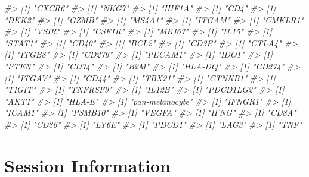 \documentclass[]{article}
\newcommand{\hlcom}[1]{\textcolor[rgb]{0.502,0.502,0.502}{\textit{#1}}}%
\newenvironment{Shaded}{\begin{myshaded}}{\end{myshaded}}
\newcommand{\CommentTok}[1]{\hlcom{#1}}
\begin{document}
\begin{Shaded}
\begin{Highlighting}[]
\CommentTok{\#\textgreater{} [1] "CXCR6"}
\CommentTok{\#\textgreater{} [1] "NKG7"}
\CommentTok{\#\textgreater{} [1] "HIF1A"}
\CommentTok{\#\textgreater{} [1] "CD4"}
\CommentTok{\#\textgreater{} [1] "DKK2"}
\CommentTok{\#\textgreater{} [1] "GZMB"}
\CommentTok{\#\textgreater{} [1] "MS4A1"}
\CommentTok{\#\textgreater{} [1] "ITGAM"}
\CommentTok{\#\textgreater{} [1] "CMKLR1"}
\CommentTok{\#\textgreater{} [1] "VSIR"}
\CommentTok{\#\textgreater{} [1] "CSF1R"}
\CommentTok{\#\textgreater{} [1] "MKI67"}
\CommentTok{\#\textgreater{} [1] "IL15"}
\CommentTok{\#\textgreater{} [1] "STAT1"}
\CommentTok{\#\textgreater{} [1] "CD40"}
\CommentTok{\#\textgreater{} [1] "BCL2"}
\CommentTok{\#\textgreater{} [1] "CD3E"}
\CommentTok{\#\textgreater{} [1] "CTLA4"}
\CommentTok{\#\textgreater{} [1] "ITGB8"}
\CommentTok{\#\textgreater{} [1] "CD276"}
\CommentTok{\#\textgreater{} [1] "PECAM1"}
\CommentTok{\#\textgreater{} [1] "IDO1"}
\CommentTok{\#\textgreater{} [1] "PTEN"}
\CommentTok{\#\textgreater{} [1] "CD74"}
\CommentTok{\#\textgreater{} [1] "B2M"}
\CommentTok{\#\textgreater{} [1] "HLA{-}DQ"}
\CommentTok{\#\textgreater{} [1] "CD274"}
\CommentTok{\#\textgreater{} [1] "ITGAV"}
\CommentTok{\#\textgreater{} [1] "CD44"}
\CommentTok{\#\textgreater{} [1] "TBX21"}
\CommentTok{\#\textgreater{} [1] "CTNNB1"}
\CommentTok{\#\textgreater{} [1] "TIGIT"}
\CommentTok{\#\textgreater{} [1] "TNFRSF9"}
\CommentTok{\#\textgreater{} [1] "IL12B"}
\CommentTok{\#\textgreater{} [1] "PDCD1LG2"}
\CommentTok{\#\textgreater{} [1] "AKT1"}
\CommentTok{\#\textgreater{} [1] "HLA{-}E"}
\CommentTok{\#\textgreater{} [1] "pan{-}melanocyte"}
\CommentTok{\#\textgreater{} [1] "IFNGR1"}
\CommentTok{\#\textgreater{} [1] "ICAM1"}
\CommentTok{\#\textgreater{} [1] "PSMB10"}
\CommentTok{\#\textgreater{} [1] "VEGFA"}
\CommentTok{\#\textgreater{} [1] "IFNG"}
\CommentTok{\#\textgreater{} [1] "CD8A"}
\CommentTok{\#\textgreater{} [1] "CD86"}
\CommentTok{\#\textgreater{} [1] "LY6E"}
\CommentTok{\#\textgreater{} [1] "PDCD1"}
\CommentTok{\#\textgreater{} [1] "LAG3"}
\CommentTok{\#\textgreater{} [1] "TNF"}
\end{Highlighting}
\end{Shaded}

\hypertarget{session-information}{%
\section*{Session Information}\label{session-information}}
\end{document}

